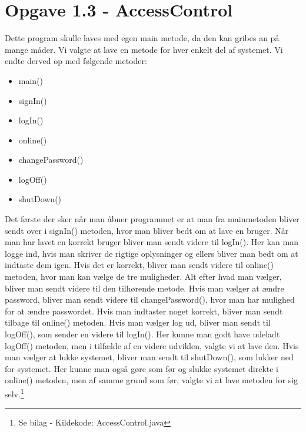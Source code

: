 \section{Opgave 1.3 - AccessControl}

Dette program skulle laves med egen main metode, da den kan gribes an på mange måder. Vi valgte at lave en metode for hver enkelt del af systemet. Vi endte derved op med følgende metoder: 

\begin{multicols}{2}
\begin{itemize}
	\item main()
	\item signIn()
	\item logIn()
	\item online()
	\item changePassword()
	\item logOff()
	\item shutDown()
\end{itemize}
\end{multicols}

\noindent Det første der sker når man åbner programmet er at man fra mainmetoden bliver sendt over i signIn() metoden, hvor man bliver bedt om at lave en bruger. Når man har lavet en korrekt bruger bliver man sendt videre til logIn(). Her kan man logge ind, hvis man skriver de rigtige oplysninger og ellers bliver man bedt om at indtaste dem igen. Hvis det er korrekt, bliver man sendt videre til online() metoden, hvor man kan vælge de tre muligheder. Alt efter hvad man vælger, bliver man sendt videre til den tilhørende metode. Hvis man vælger at ændre password, bliver man sendt videre til changePassword(), hvor man har mulighed for at ændre passwordet. Hvis man indtaster noget korrekt, bliver man sendt tilbage til online() metoden. Hvis man vælger log ud, bliver man sendt til logOff(), som sender en videre til logIn(). Her kunne man godt have udeladt logOff() metoden, men i tilfælde af en videre udviklen, valgte vi at lave den. Hvis man vælger at lukke systemet, bliver man sendt til shutDown(), som lukker ned for systemet. Her kunne man også gøre som før og slukke systemet direkte i online() metoden, men af samme grund som før, valgte vi at lave metoden for sig selv.\footnote{Se bilag - Kildekode: AccessControl.java}